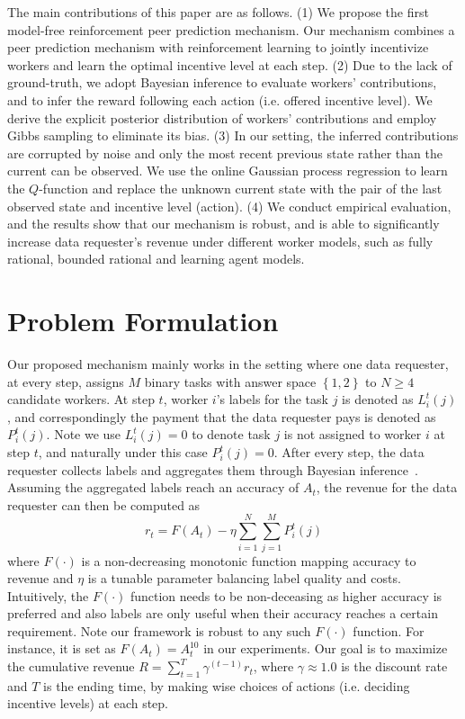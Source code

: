 \documentclass[letterpaper]{article} %
\begin{document}
The main contributions of this paper are as follows.
(1) We propose the first model-free reinforcement peer prediction mechanism.
Our mechanism combines a peer prediction mechanism with reinforcement learning to jointly incentivize workers and learn the optimal incentive level at each step.
(2) Due to the lack of ground-truth, we adopt Bayesian inference to evaluate workers' contributions, and to infer the reward following each action (i.e. offered incentive level). We derive the explicit posterior distribution of workers' contributions and employ Gibbs sampling to eliminate its bias.
(3) In our setting, the inferred contributions are corrupted by noise and only the most recent previous state rather than the current can be observed. We use the online Gaussian process regression to learn the $Q$-function and replace the unknown current state with the pair of the last observed state and incentive level (action).
(4) We conduct empirical evaluation, and the results show that our mechanism is robust, and is able to significantly increase data requester's revenue under different worker models, such as fully rational, bounded rational and learning agent models.

\section{Problem Formulation}
Our proposed mechanism mainly works in the setting where one data requester, at every step, assigns $M$ binary tasks with answer space $\left\{1,2\right\}$ to $N \geq 4$ candidate workers. At step $t$, worker $i$'s labels for the task $j$ is denoted as $L_i^t(j)$, and correspondingly the payment that the data requester pays is denoted as $P^{t}_i(j)$. Note we use $L^{t}_i(j)=0$ to denote task $j$ is not assigned to worker $i$ at step $t$, and naturally under this case $P^{t}_i(j)=0$.
After every step, the data requester collects labels and aggregates them through Bayesian inference~\cite{zheng2017truth}.
Assuming the aggregated labels reach an accuracy of $A_t$,  the revenue for the data requester can then be computed as
\begin{equation}
r_t = F(A_t) - \eta {\sum}_{i=1}^{N}{\sum}_{j=1}^{M}P^t_i(j)
\end{equation}
where $F(\cdot)$ is a non-decreasing monotonic function mapping accuracy to revenue and $\eta$ is a
tunable parameter balancing label quality and costs. Intuitively, the $F(\cdot)$ function needs to be non-deceasing as higher accuracy is preferred and also labels are only useful when their accuracy reaches a certain requirement. Note our framework is robust to any such $F(\cdot)$ function. For instance, it is set as $F(A_t)=A^{10}_t$ in our experiments.
Our goal is to maximize the cumulative revenue $R = \sum_{t=1}^{T} \gamma^{(t-1)} r_t$, where $\gamma\approx 1.0$ is the discount rate and $T$ is the ending time, by making wise choices of actions  (i.e. deciding incentive levels) at each step.
\end{document}
